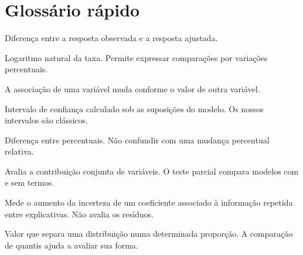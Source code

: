 \section{Glossário rápido}
\begin{description}[leftmargin=0pt]
\item[Resíduo.] Diferença entre a resposta observada e a resposta ajustada.
\item[ln(taxa).] Logaritmo natural da taxa. Permite expressar comparações por variações percentuais.
\item[Interação.] A associação de uma variável muda conforme o valor de outra variável.
\item[IC.] Intervalo de confiança calculado sob as suposições do modelo. Os nossos intervalos são clássicos.
\item[ponto percentual.] Diferença entre percentuais. Não confundir com uma mudança percentual relativa.
\item[Teste $F$.] Avalia a contribuição conjunta de variáveis. O teste parcial compara modelos com e sem termos.
\item[VIF.] Mede o aumento da incerteza de um coeficiente associado à informação repetida entre explicativas. Não avalia os resíduos.
\item[Quantil.] Valor que separa uma distribuição numa determinada proporção. A comparação de quantis ajuda a avaliar sua forma.
\end{description}
